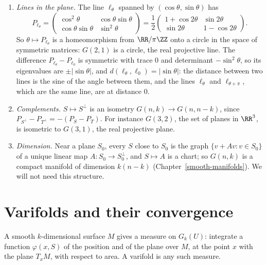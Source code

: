 \begin{example}\label{currents:example-grassmannian}
\begin{enumerate}
\item \emph{Lines in the plane.} The line $\ell_\theta$ spanned by $(\cos\theta, \sin\theta)$ has
\[
P_{\ell_\theta} = \begin{pmatrix}\cos^2\theta & \cos\theta\sin\theta \\ \cos\theta\sin\theta & \sin^2\theta\end{pmatrix} = \frac12\begin{pmatrix}1 + \cos2\theta & \sin2\theta \\ \sin2\theta & 1 - \cos2\theta\end{pmatrix}.
\]
So $\theta \mapsto P_{\ell_\theta}$ is a homeomorphism from $\RR/\pi\ZZ$ onto a circle in the space of symmetric matrices: $G(2, 1)$ is a circle, the real projective line. The difference
$P_{\ell_\theta} - P_{\ell_0}$ is symmetric with trace $0$ and determinant $-\sin^2\theta$, so its eigenvalues are $\pm|\sin\theta|$, and $d(\ell_\theta, \ell_0) = |\sin\theta|$: the distance between two
lines is the sine of the angle between them, and the lines $\ell_\theta$ and $\ell_{\theta + \pi}$, which are the same line, are at distance $0$.
\item \emph{Complements.} $S \mapsto S^\perp$ is an isometry $G(n, k) \to G(n, n - k)$, since $P_{S^\perp} - P_{T^\perp} = -(P_S - P_T)$. For instance $G(3, 2)$, the set of planes in $\RR^3$, is
isometric to $G(3, 1)$, the real projective plane.
\item \emph{Dimension.} Near a plane $S_0$, every $S$ close to $S_0$ is the graph $\{v + Av : v \in S_0\}$ of a unique linear map $A \colon S_0 \to S_0^\perp$, and $S \mapsto A$ is a chart; so $G(n, k)$ is
a compact manifold of dimension $k(n - k)$ (Chapter~\ref{smooth-manifolds}). We will not need this structure.
\end{enumerate}
\end{example}

\section{Varifolds and their convergence}\label{currents:section-varifold-convergence}

A smooth $k$-dimensional surface $M$ gives a measure on $G_k(U)$: integrate a function $\varphi(x, S)$ of the position and of the plane over $M$, at the point $x$ with the plane $T_xM$, with respect to area.
A varifold is any such measure.


